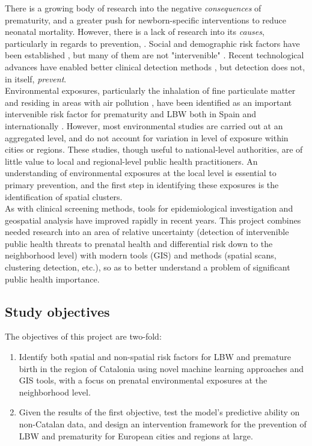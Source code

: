 \documentclass{article}
\begin{document}
\begin{multicols}{2}
\noindent There is a growing body of research into the negative \emph{consequences} of prematurity, and a greater push for newborn-specific interventions to reduce neonatal mortality. \cite{Eichenwald2008, Wardlaw2014} However, there is a lack of research into its \emph{causes}, particularly in regards to prevention, \cite{GrisaruGranovsky2014,Rubens2014}.  Social and demographic risk factors have been established \cite{Slopen2015, Yego2014}, but many of them are not "intervenible" \cite{Schempf2007, Shah2010, Kozuki2013}. Recent technological advances have enabled better clinical detection methods \cite{Hatanaka2014, Wapner2014}, but detection does not, in itself, \emph{prevent}. \\

\noindent Environmental exposures, particularly the inhalation of fine particulate matter and residing in areas with air pollution , have been identified as an important intervenible risk factor for prematurity and LBW both in Spain \cite{2014} and internationally \cite{Yorifuji2015, Morales2014, deMelo2014}. However, most environmental studies are carried out at an aggregated level, and do not account for variation in level of exposure within cities or regions. These studies, though useful to national-level authorities, are of little value to local and regional-level public health practitioners.  An understanding of environmental exposures at the local level is essential to primary prevention, and the first step in identifying these exposures is the identification of spatial clusters.  \\

\noindent As with clinical screening methods, tools for epidemiological investigation and geospatial analysis have improved rapidly in recent years.  This project combines needed research into an area of relative uncertainty (detection of intervenible public health threats to prenatal health and differential risk down to the neighborhood level) with modern tools (GIS) and methods (spatial scans, clustering detection, etc.), so as to better understand a problem of significant public health importance.


\subsection*{Study objectives}
The objectives of this project are two-fold: 
\begin{enumerate}
\item Identify both spatial and non-spatial risk factors for LBW and premature birth in the region of Catalonia using novel machine learning approaches and GIS tools, with a focus on prenatal environmental exposures at the neighborhood level.
\item Given the results of the first objective, test the model's predictive ability on non-Catalan data, and design an intervention framework for the prevention of LBW and prematurity for European cities and regions at large. 
\end{enumerate}



\end{multicols}
\end{document}
